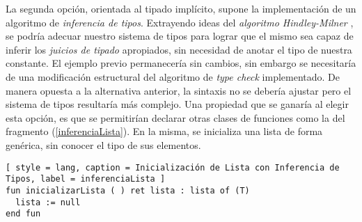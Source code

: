 La segunda opción, orientada al tipado implícito, supone la implementación de un algoritmo de \textit{inferencia de tipos}.
Extrayendo ideas del \textit{algoritmo Hindley-Milner} \cite{Inferencia}, se podría adecuar nuestro sistema de tipos para lograr que el mismo sea capaz de inferir los \textit{juicios de tipado} apropiados, sin necesidad de anotar el tipo de nuestra constante.
El ejemplo previo permanecería sin cambios, sin embargo se necesitaría de una modificación estructural del algoritmo de \textit{type check} implementado.
De manera opuesta a la alternativa anterior, la sintaxis no se debería ajustar pero el sistema de tipos resultaría más complejo.
Una propiedad que se ganaría al elegir esta opción, es que se permitirían declarar otras clases de funciones como la del fragmento (\ref{inferenciaLista}).
En la misma, se inicializa una lista de forma genérica, sin conocer el tipo de sus elementos.

\begin{lstlisting}[ style = lang, caption = Inicialización de Lista con Inferencia de Tipos, label = inferenciaLista ]
fun inicializarLista ( ) ret lista : lista of (T)
  lista := null
end fun
\end{lstlisting}

\iffalse


Este concepto permitiría deducir el tipo de la constante, sin necesidad de modificar la sintaxis del lenguaje pero complicando el chequeo de tipos del intérprete.
\fi

\iffalse
\subsection{Forzar Indentación}
\subsection{Phantom Types}
\fi